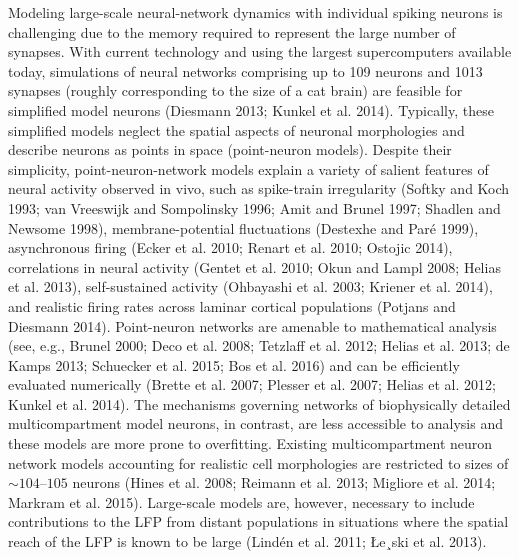 Modeling large-scale neural-network dynamics with individual spiking neurons is challenging due to the memory required to represent the large number of synapses. With current technology and using the largest supercomputers available today, simulations of neural networks comprising up to 109 neurons and 1013 synapses (roughly corresponding to the size of a cat brain) are feasible for simplified model neurons (Diesmann 2013; Kunkel et al. 2014). Typically, these simplified models
neglect the spatial aspects of neuronal morphologies and describe neurons as points in space (point-neuron models).
Despite their simplicity, point-neuron-network models explain
a variety of salient features of neural activity observed in vivo,
such as spike-train irregularity (Softky and Koch 1993; van
Vreeswijk and Sompolinsky 1996; Amit and Brunel 1997;
Shadlen and Newsome 1998), membrane-potential fluctuations
(Destexhe and Paré 1999), asynchronous firing (Ecker et al. 2010;
Renart et al. 2010; Ostojic 2014), correlations in neural activity
(Gentet et al. 2010; Okun and Lampl 2008; Helias et al. 2013),
self-sustained activity (Ohbayashi et al. 2003; Kriener et al.
2014), and realistic firing rates across laminar cortical populations (Potjans and Diesmann 2014). Point-neuron networks are
amenable to mathematical analysis (see, e.g., Brunel 2000; Deco
et al. 2008; Tetzlaff et al. 2012; Helias et al. 2013; de Kamps
2013; Schuecker et al. 2015; Bos et al. 2016) and can be efficiently evaluated numerically (Brette et al. 2007; Plesser et al.
2007; Helias et al. 2012; Kunkel et al. 2014). The mechanisms
governing networks of biophysically detailed multicompartment model neurons, in contrast, are less accessible to analysis
and these models are more prone to overfitting. Existing multicompartment neuron network models accounting for realistic
cell morphologies are restricted to sizes of $\sim104
–105$ neurons
(Hines et al. 2008; Reimann et al. 2013; Migliore et al. 2014;
Markram et al. 2015). Large-scale models are, however, necessary to include contributions to the LFP from distant populations in situations where the spatial reach of the LFP is known
to be large (Lindén et al. 2011; Łe¸ski et al. 2013). 

